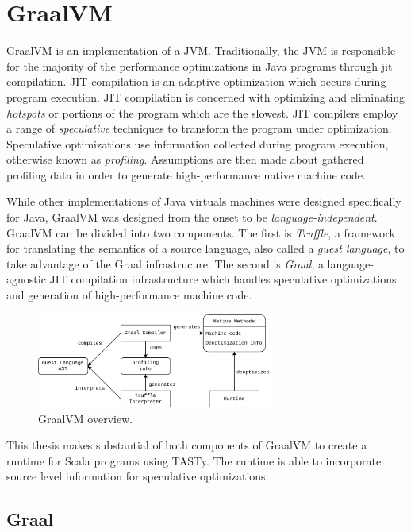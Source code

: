 \section{GraalVM}

GraalVM\cite{java:graalvm} is an implementation of a JVM.
Traditionally, the JVM is responsible for the majority of the performance optimizations in Java programs\cite{java:hotspot} through \acrfull{jit} compilation.
JIT compilation is an adaptive optimization which occurs during program execution.
JIT compilation is concerned with optimizing and eliminating \textit{hotspots} or portions of the program which are the slowest.
JIT compilers\cite{java:sablevm}\cite{java:jikesrvm} employ a range of \textit{speculative} techniques to transform the program under optimization.
Speculative optimizations use information collected during program execution, otherwise known as \textit{profiling}. 
Assumptions are then made about gathered profiling data in order to generate high-performance native machine code.

While other implementations of Java virtuals machines were designed specifically for Java, GraalVM was designed from the onset to be \textit{language-independent}.
GraalVM can be divided into two components. 
The first is \textit{Truffle}, a framework for translating the semantics of a source language, also called a \textit{guest language}, to take advantage of the Graal infrastrucure.
The second is \textit{Graal}, a language-agnostic JIT compilation infrastructure which handles speculative optimizations and generation of high-performance machine code.

\begin{figure}[!htb]
	\centering
	\includegraphics[width=0.7\textwidth]{figures/graalvm-pipeline.png}
	\caption{GraalVM overview\cite{graalvm:ir}.}
\end{figure}

This thesis makes substantial of both components of GraalVM to create a runtime for Scala programs using TASTy.
The runtime is able to incorporate source level information for speculative optimizations.


\subsection{Graal}


